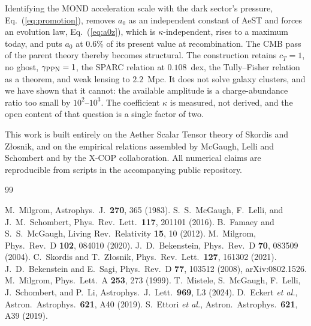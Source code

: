 \documentclass[aps,prd,twocolumn,superscriptaddress,nofootinbib,floatfix]{revtex4-2}
\newcommand{\azero}{a_{0}}
\begin{document}
Identifying the MOND acceleration scale with the dark sector's pressure,
Eq.~(\ref{eq:promotion}), removes $\azero$ as an independent constant of AeST and forces an
evolution law, Eq.~(\ref{eq:a0z}), which is $\kappa$-independent, rises to a maximum today, and
puts $\azero$ at $0.6\%$ of its present value at recombination. The CMB pass of the parent theory
thereby becomes structural. The construction retains $c_{T}=1$, no ghost, $\gamma_{\rm PPN} = 1$,
the SPARC relation at $0.108$~dex, the Tully--Fisher relation as a theorem, and weak lensing to
$2.2$~Mpc. It does not solve galaxy clusters, and we have shown that it cannot: the available
amplitude is a charge-abundance ratio too small by $10^{2}$--$10^{3}$. The coefficient $\kappa$
is measured, not derived, and the open content of that question is a single factor of two.

\begin{acknowledgments}
This work is built entirely on the Aether Scalar Tensor theory of Skordis and Z\l osnik, and on
the empirical relations assembled by McGaugh, Lelli and Schombert and by the X-COP
collaboration. All numerical claims are reproducible from scripts in the accompanying public
repository.
\end{acknowledgments}

\begin{thebibliography}{99}

 M.~Milgrom, Astrophys.\ J.\ \textbf{270}, 365 (1983).
 S.~S.~McGaugh, F.~Lelli, and J.~M.~Schombert,
  Phys.\ Rev.\ Lett.\ \textbf{117}, 201101 (2016).
 B.~Famaey and S.~S.~McGaugh,
  Living Rev.\ Relativity \textbf{15}, 10 (2012).
 M.~Milgrom, Phys.\ Rev.\ D \textbf{102}, 084010 (2020).
 J.~D.~Bekenstein, Phys.\ Rev.\ D \textbf{70}, 083509 (2004).
 C.~Skordis and T.~Z\l osnik,
  Phys.\ Rev.\ Lett.\ \textbf{127}, 161302 (2021).
 J.~D.~Bekenstein and E.~Sagi,
  Phys.\ Rev.\ D \textbf{77}, 103512 (2008), arXiv:0802.1526.
 M.~Milgrom, Phys.\ Lett.\ A \textbf{253}, 273 (1999).
 T.~Mistele, S.~McGaugh, F.~Lelli, J.~Schombert, and P.~Li,
  Astrophys.\ J.\ Lett.\ \textbf{969}, L3 (2024).
 D.~Eckert \textit{et al.}, Astron.\ Astrophys.\ \textbf{621}, A40 (2019).
 S.~Ettori \textit{et al.}, Astron.\ Astrophys.\ \textbf{621}, A39 (2019).

\end{thebibliography}
\end{document}
